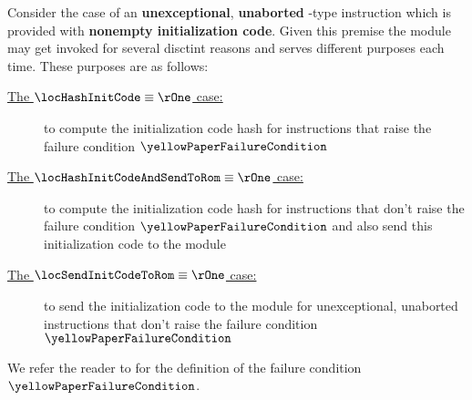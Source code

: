 Consider the case of an \textbf{unexceptional}, \textbf{unaborted} -type instruction which is provided with \textbf{nonempty initialization code}.
Given this premise the \mmuMod{} module may get invoked for several disctint reasons and serves different purposes each time.
These purposes are as follows:
\begin{description}
	\item[\underline{The $\locHashInitCode \equiv \rOne \phantom{\big|}\!\!$ case:}]
		to compute the initialization code hash for  instructions that raise the failure condition $\yellowPaperFailureCondition$
	\item[\underline{The $\locHashInitCodeAndSendToRom \equiv \rOne \phantom{\big|}\!\!$ case:}]
		to compute the initialization code hash for  instructions that don't raise the failure condition $\yellowPaperFailureCondition$ and also send this initialization code to the \romMod{} module
	\item[\underline{The $\locSendInitCodeToRom \equiv \rOne \phantom{\big|}\!\!$ case:}]
		to send the initialization code to the \romMod{} module for unexceptional, unaborted  instructions that don't raise the failure condition $\yellowPaperFailureCondition$
\end{description}
We refer the reader to \cite{EYP-London} for the definition of the failure condition $\yellowPaperFailureCondition$.

